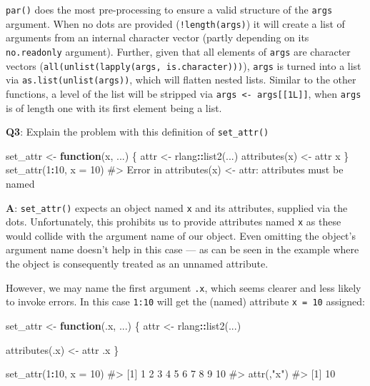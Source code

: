 \documentclass[
]{krantz}
\makeatletter
\newenvironment{Shaded}{\begin{snugshade}}{\end{snugshade}}
\newcommand{\CommentTok}[1]{\textcolor[rgb]{0.56,0.35,0.01}{\textit{#1}}}
\newcommand{\ControlFlowTok}[1]{\textcolor[rgb]{0.13,0.29,0.53}{\textbf{#1}}}
\newcommand{\DataTypeTok}[1]{\textcolor[rgb]{0.13,0.29,0.53}{#1}}
\newcommand{\DecValTok}[1]{\textcolor[rgb]{0.00,0.00,0.81}{#1}}
\newcommand{\KeywordTok}[1]{\textcolor[rgb]{0.13,0.29,0.53}{\textbf{#1}}}
\newcommand{\NormalTok}[1]{#1}
\newcommand{\OperatorTok}[1]{\textcolor[rgb]{0.81,0.36,0.00}{\textbf{#1}}}
\newcommand{\StringTok}[1]{\textcolor[rgb]{0.31,0.60,0.02}{#1}}
\newenvironment{kframe}{%
\medskip{}
\setlength{\fboxsep}{.8em}
 \def\at@end@of@kframe{}%
 \ifinner\ifhmode%
  \def\at@end@of@kframe{\end{minipage}}%
  \begin{minipage}{\columnwidth}%
 \fi\fi%
 \def\FrameCommand##1{\hskip\@totalleftmargin \hskip-\fboxsep
 \colorbox{shadecolor}{##1}\hskip-\fboxsep
     \hskip-\linewidth \hskip-\@totalleftmargin \hskip\columnwidth}%
 \MakeFramed {\advance\hsize-\width
   \@totalleftmargin\z@ \linewidth\hsize
   \@setminipage}}%
 {\par\unskip\endMakeFramed%
 \at@end@of@kframe}
\renewenvironment{Shaded}{\begin{kframe}}{\end{kframe}}
\renewcommand{\KeywordTok} [1]{\textcolor[rgb]{0.00,0.44,0.13}{{#1}}}
\renewcommand{\DataTypeTok}[1]{\textcolor[rgb]{0.56,0.13,0.00}{{#1}}}
\renewcommand{\DecValTok}  [1]{\textcolor[rgb]{0.25,0.63,0.44}{{#1}}}
\renewcommand{\StringTok}  [1]{\textcolor[rgb]{0.25,0.44,0.63}{{#1}}}
\renewcommand{\CommentTok} [1]{\textcolor[rgb]{0.38,0.63,0.69}{{#1}}}
\renewcommand{\NormalTok}  [1]{{#1}}
\makeatother
\begin{document}
\texttt{par()} does the most pre-processing to ensure a valid structure of the \texttt{args} argument. When no dots are provided (\texttt{!length(args)}) it will create a list of arguments from an internal character vector (partly depending on its \texttt{no.readonly} argument). Further, given that all elements of \texttt{args} are character vectors (\texttt{all(unlist(lapply(args,\ is.character)))}), \texttt{args} is turned into a list via \texttt{as.list(unlist(args))}, which will flatten nested lists. Similar to the other functions, a level of the list will be stripped via \texttt{args\ \textless{}-\ args{[}{[}1L{]}{]}}, when \texttt{args} is of length one with its first element being a list.

\textbf{{Q3}}: Explain the problem with this definition of \texttt{set\_attr()}

\begin{Shaded}
\begin{Highlighting}[]
\NormalTok{set_attr <-}\StringTok{ }\ControlFlowTok{function}\NormalTok{(x, ...) \{}
\NormalTok{  attr <-}\StringTok{ }\NormalTok{rlang}\OperatorTok{::}\KeywordTok{list2}\NormalTok{(...)}
  \KeywordTok{attributes}\NormalTok{(x) <-}\StringTok{ }\NormalTok{attr}
\NormalTok{  x}
\NormalTok{\}}
\KeywordTok{set_attr}\NormalTok{(}\DecValTok{1}\OperatorTok{:}\DecValTok{10}\NormalTok{, }\DataTypeTok{x =} \DecValTok{10}\NormalTok{)}
\CommentTok{#> Error in attributes(x) <- attr: attributes must be named}
\end{Highlighting}
\end{Shaded}

\textbf{{A}}: \texttt{set\_attr()} expects an object named \texttt{x} and its attributes, supplied via the dots. Unfortunately, this prohibits us to provide attributes named \texttt{x} as these would collide with the argument name of our object. Even omitting the object's argument name doesn't help in this case --- as can be seen in the example where the object is consequently treated as an unnamed attribute.

However, we may name the first argument \texttt{.x}, which seems clearer and less likely to invoke errors. In this case \texttt{1:10} will get the (named) attribute \texttt{x\ =\ 10} assigned:

\begin{Shaded}
\begin{Highlighting}[]
\NormalTok{set_attr <-}\StringTok{ }\ControlFlowTok{function}\NormalTok{(.x, ...) \{}
\NormalTok{  attr <-}\StringTok{ }\NormalTok{rlang}\OperatorTok{::}\KeywordTok{list2}\NormalTok{(...)}
  
  \KeywordTok{attributes}\NormalTok{(.x) <-}\StringTok{ }\NormalTok{attr}
\NormalTok{  .x}
\NormalTok{\}}

\KeywordTok{set_attr}\NormalTok{(}\DecValTok{1}\OperatorTok{:}\DecValTok{10}\NormalTok{, }\DataTypeTok{x =} \DecValTok{10}\NormalTok{)}
\CommentTok{#>  [1]  1  2  3  4  5  6  7  8  9 10}
\CommentTok{#> attr(,"x")}
\CommentTok{#> [1] 10}
\end{Highlighting}
\end{Shaded}
\end{document}
